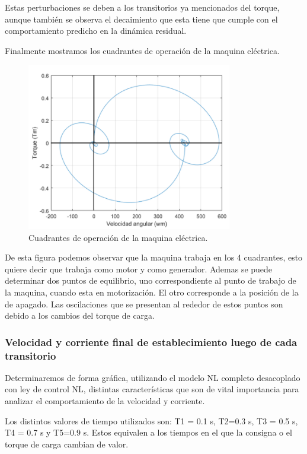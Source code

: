 \documentclass{article}
\begin{document}
Estas perturbaciones se deben a los transitorios ya mencionados del torque, aunque también se observa 
el decaimiento que esta tiene que cumple con el comportamiento predicho en la dinámica residual. 

Finalmente mostramos los cuadrantes de operación de la maquina eléctrica.

\begin{figure}[H]
    \centering
    \includegraphics[width=0.8\textwidth]{5.1.6_torque_velocidad.png}
    \caption{Cuadrantes de operación de la maquina eléctrica.}
\end{figure}

De esta figura podemos observar que la maquina trabaja en los 4 cuadrantes, esto quiere decir que trabaja como 
motor y como generador. Ademas se puede determinar dos puntos de equilibrio, uno correspondiente al punto 
de trabajo de la maquina, cuando esta en motorización. El otro corresponde a la posición de la de apagado.
Las oscilaciones que se presentan al rededor de estos puntos son debido a los cambios del torque de carga.

\subsubsection{Velocidad y corriente final de establecimiento luego de cada transitorio}

Determinaremos de forma gráfica, utilizando el modelo NL completo desacoplado con ley de control  NL, 
distintas características que son de vital importancia para analizar el comportamiento de la velocidad 
y corriente.

Los distintos valores de tiempo utilizados son: T1 = 0.1 s, T2=0.3 s, T3 = 0.5 s, T4 = 0.7 s y T5=0.9 s. 
Estos equivalen a los tiempos en el que la consigna o el torque de carga cambian de valor.
\end{document}
